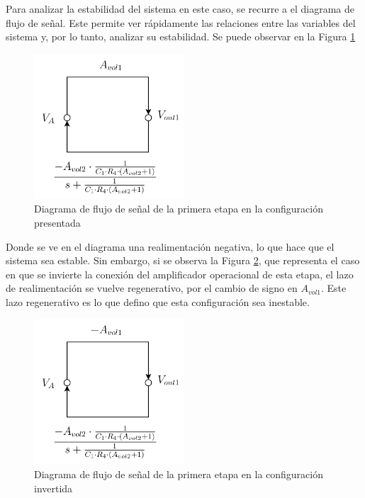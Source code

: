 Para analizar la estabilidad del sistema en este caso, se recurre a el diagrama de flujo de se\~nal. Este permite ver r\'apidamente las relaciones entre las variables del sistema y, por lo tanto, analizar su estabilidad. 
Se puede observar en la Figura \ref{fig:SFD_stable}
\begin{figure}[H]
    
    \centering
    \includegraphics[width=0.5\textwidth]{../EJ3/Recursos/first_stable}
    \caption{Diagrama de flujo de se\~nal de la primera etapa en la configuraci\'on presentada}
    \label{fig:SFD_stable}
\end{figure}

Donde se ve en el diagrama una realimentaci\'on negativa, lo que hace que el sistema sea estable. Sin embargo, si se observa la Figura \ref{fig:SFD_unstable}, que representa el caso en que se invierte la conexi\'on del amplificador operacional de esta etapa, el lazo de realimentaci\'on se vuelve regenerativo, por el cambio de signo en $A_{vol1}$. Este lazo regenerativo es lo que defino que esta configuraci\'on sea inestable.
\begin{figure}[H]
   
    \centering
    \includegraphics[width=0.5\textwidth]{../EJ3/Recursos/first_unstable}
    \caption{Diagrama de flujo de se\~nal de la primera etapa en la configuraci\'on invertida}
    \label{fig:SFD_unstable}
\end{figure}
\par
